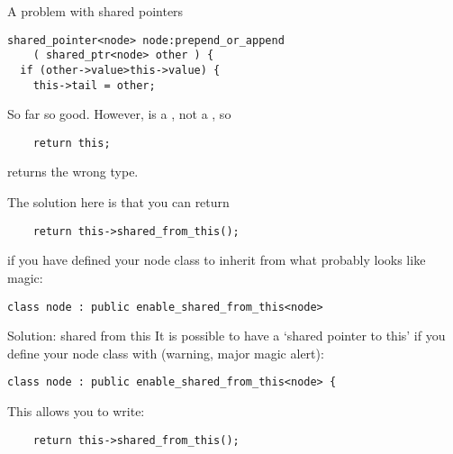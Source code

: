 \begin{slide}{A problem with shared pointers}
  \label{sl:share-ptr-node-sh}
\begin{verbatim}
shared_pointer<node> node:prepend_or_append
    ( shared_ptr<node> other ) {
  if (other->value>this->value) {
    this->tail = other;
\end{verbatim}
So far so good. However,  is a , not a
, so
\begin{verbatim}
    return this;
\end{verbatim}
returns the wrong type.
\end{slide}

The solution here is that you can return
\begin{verbatim}
    return this->shared_from_this();
\end{verbatim}
if you have defined your node class to inherit from what probably
looks like magic:
\begin{verbatim}
class node : public enable_shared_from_this<node>
\end{verbatim}

\begin{slide}{Solution: shared from this}
  \label{sl:share-ptr-node-from}
  It is possible to have a `shared pointer to this' if you
  define your node class with (warning, major magic alert):
\begin{verbatim}
class node : public enable_shared_from_this<node> {
\end{verbatim}
This allows you to write:
\begin{verbatim}
    return this->shared_from_this();
\end{verbatim}
\end{slide}
